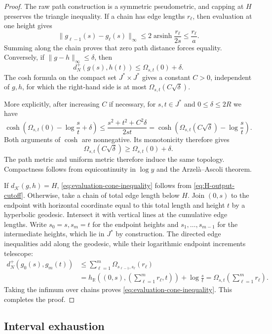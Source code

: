 \documentclass[10pt,a4paper]{amsart}
\numberwithin{equation}{section}
\newcommand{\R}{\mathbb R}
\DeclareMathOperator{\arsinh}{arsinh}
\begin{document}
\begin{proof}
The raw path construction is a symmetric pseudometric, and capping at $H$ preserves the triangle inequality.  If a chain has edge lengths $r_\ell$, then evaluation at one height gives
\[ \lVert g_{\ell-1}(s)-g_\ell(s)\rVert_\infty \le2\arsinh\frac{r_\ell}{2s} \le\frac{r_\ell}{a}. \]
Summing along the chain proves that zero path distance forces equality.  Conversely, if $\lVert g-h\rVert_\infty\le\delta$, then
\[ d_N^+(g(s),h(t))\le\Omega_{s,t}(0)+\delta. \]
The cosh formula on the compact set $J^*\times J^*$ gives a constant $C>0$, independent of $g,h$, for which the right-hand side is at most $\Omega_{s,t}(C\sqrt\delta)$.

More explicitly, after increasing $C$ if necessary, for $s,t\in J^*$ and $0\le\delta\le2R$ we have
\[ \cosh\left(\Omega_{s,t}(0)-\log\frac{s}{t}+\delta\right) \le\frac{s^2+t^2+C^2\delta}{2st} =\cosh\left(\Omega_{s,t}(C\sqrt\delta)-\log\frac{s}{t}\right). \]
Both arguments of $\cosh$ are nonnegative.  Its monotonicity therefore gives
\[ \Omega_{s,t}(C\sqrt\delta)\ge\Omega_{s,t}(0)+\delta. \]
The path metric and uniform metric therefore induce the same topology.  Compactness follows from equicontinuity in $\log y$ and the Arzel\`a--Ascoli theorem.

If $d_{\mathscr K}(g,h)=H$, \eqref{eq:evaluation-cone-inequality} follows from \eqref{eq:H-output-cutoff}.  Otherwise, take a chain of total edge length below $H$.  Join $(0,s)$ to the endpoint with horizontal coordinate equal to this total length and height $t$ by a hyperbolic geodesic.  Intersect it with vertical lines at the cumulative edge lengths.  Write $s_0=s,s_m=t$ for the endpoint heights and $s_1,\ldots,s_{m-1}$ for the intermediate heights, which lie in $J^*$ by construction.  The directed edge inequalities add along the geodesic, while their logarithmic endpoint increments telescope:
\[
 \begin{aligned}
d_N^+(g_0(s),g_m(t)) &\le\sum_{\ell=1}^m\Omega_{s_{\ell-1},s_\ell}(r_\ell)\\
 &=h_{\R}\left((0,s),\left(\sum_{\ell=1}^m r_\ell,t\right)\right)+\log\frac{s}{t}
 =\Omega_{s,t}\left(\sum_{\ell=1}^m r_\ell\right).
 \end{aligned}
\]
Taking the infimum over chains proves \eqref{eq:evaluation-cone-inequality}.  This completes the proof.
\end{proof}

\subsection{Interval exhaustion}
\end{document}
